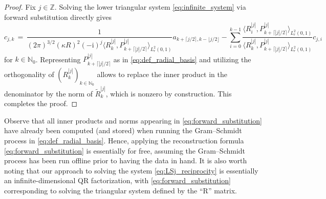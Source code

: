 \documentclass[11pt,a4paper]{article}
\theoremstyle{definition}
\theoremstyle{remark} \newtheorem{remark}[theorem]{Remark}
\numberwithin{equation}{section}
\numberwithin{figure}{section}
\numberwithin{algorithm}{section}
\numberwithin{table}{section}
\newcommand{\field}[1]{{\mathbb{#1}}}
\newcommand{\N}{\field{N}}
\newcommand{\Z}{\field{Z}}
\newcommand{\rmi}{\mathrm{i}}
\begin{document}
\begin{proof}
Fix $j \in \Z$. Solving the lower triangular system \eqref{eq:infinite_system} via forward substitution directly gives
\begin{equation*}
	c_{j,k} \,=\, \frac 1 {(2\pi)^{3/2}(\kappa R)^2(-\rmi)^j \big \langle R_{k}^{|j|}, P_{k+\lceil |j|/2\rceil}^{|j|} \big \rangle_{L^2_r(0,1)}} a_{k+\lceil j/2\rceil, k-\lfloor j/2\rfloor} 
	- \sum_{i=0}^{k-1} \frac{\big \langle R_{i}^{|j|}, P_{k+\lceil |j|/2\rceil}^{|j|} \big \rangle_{L^2_r(0,1)}}{\big \langle R_{k}^{|j|}, P_{k+\lceil |j|/2\rceil}^{|j|}\big \rangle_{L^2_r(0,1)}} c_{j, i} \, 
\end{equation*}
for $k \in \N_0$. Representing $P_{k+\lceil |j|/2\rceil}^{|j|}$ as in \eqref{eq:def_radial_basis} and utilizing the orthogonality of $(R_{k}^{|j|})_{k \in \N_0}$ allows to replace the inner product in the denominator by the norm of $\widetilde{R}_{k}^{|j|}$, which is nonzero by construction. This completes the proof. 
\end{proof}

Observe that all inner products and norms appearing in \eqref{eq:forward_substitution} have already been computed (and stored) when running the Gram--Schmidt process in \eqref{eq:def_radial_basis}. Hence, applying the reconstruction formula \eqref{eq:forward_substitution}  is essentially for free, assuming the Gram--Schmidt process has been run offline prior to having the data in hand. It is also worth noting that our approach to solving the system \eqref{eq:LSj_reciprocity} is essentially an infinite-dimensional QR factorization, with \eqref{eq:forward_substitution} corresponding to solving the triangular system defined by the ``R'' matrix.
\end{document}
